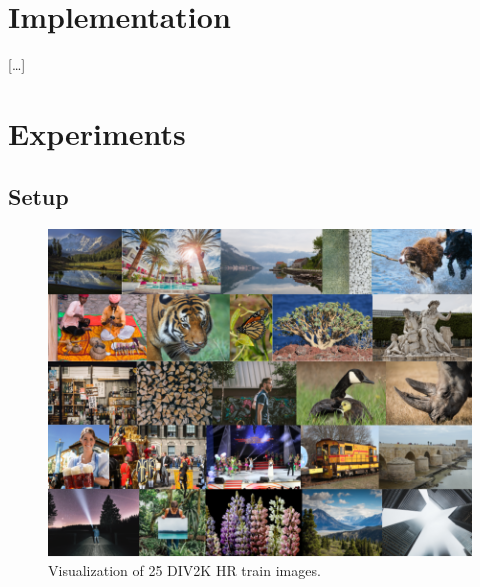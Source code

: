 \documentclass{article}
\begin{document}
{
    \section{Implementation}
    \label{sec:implementation}

    […]
}

{
    \section{Experiments}
    \label{sec:experiments}

    \subsection{Setup}
    \label{subsec:setup}

    \begin{figure}[ht]
        \centering
        \includegraphics[width=\textwidth]{images/DIV2K_HR.png}
        \caption{Visualization of 25 DIV2K HR train images.}
        \label{fig:div2k-train-og}
    \end{figure}

}
\end{document}
